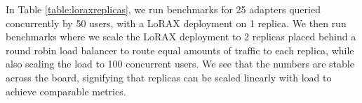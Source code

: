 In Table \ref{table:loraxreplicas}, we run benchmarks for 25 adapters queried concurrently by 50 users, with a LoRAX deployment on 1 replica. We then run benchmarks where we scale the LoRAX deployment to 2 replicas placed behind a round robin load balancer to route equal amounts of traffic to each replica, while also scaling the load to 100 concurrent users. We see that the numbers are stable across the board, signifying that replicas can be scaled linearly with load to achieve comparable metrics.


\begin{table}[ht]

\vspace{5mm}
\caption{Benchmarking 25 adapters on 1 LoRAX replica vs. 2 replicas with queries that simulate real load.}
\label{table:loraxreplicas}
\end{table}